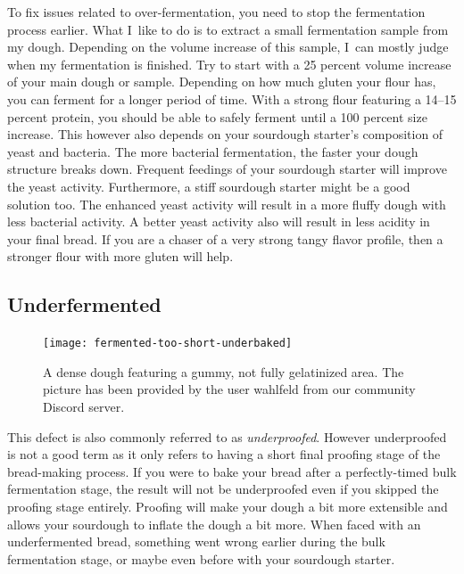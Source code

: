 To fix issues related to over-fermentation, you need to stop the fermentation process
earlier. What I~like to do is to extract a small fermentation sample from my dough.
Depending on the volume increase of this sample, I~can mostly judge when my fermentation
is finished. Try to start with a 25 percent volume increase of your main dough or sample.
Depending on how much gluten your flour has, you can ferment for a longer period of time.
With a strong flour featuring a 14--15 percent protein, you should be able to safely
ferment until a 100 percent size increase. This however also depends on your
sourdough starter's composition of yeast and bacteria. The more bacterial fermentation,
the faster your dough structure breaks down. Frequent feedings of your sourdough
starter will improve the yeast activity. Furthermore, a stiff sourdough starter
might be a good solution too. The enhanced yeast activity will result in a more fluffy
dough with less bacterial activity. A better yeast activity also will result
in less acidity in your final bread. If you are a chaser of a very strong tangy
flavor profile, then a stronger flour with more gluten will help.


\subsection{Underfermented}

\begin{figure}
  \texttt{[image: fermented-too-short-underbaked]}
  \caption{A dense dough featuring a gummy, not fully gelatinized area.
  The picture has been provided by the user wahlfeld from our community
Discord server.}%
  \label{fig:fermented-too-short-underbaked}
\end{figure}

This defect is also commonly referred to as \emph{underproofed}. However underproofed
is not a good term as it only refers to having a short final
proofing stage of the bread-making process.
If you were to bake your bread after a perfectly-timed bulk fermentation stage,
the result will not be underproofed even if you skipped the proofing stage entirely.
Proofing will make your dough a bit more extensible and allows your sourdough
to inflate the dough a bit more. When faced with an underfermented bread, something
went wrong earlier during the bulk fermentation stage, or maybe even
before with your sourdough starter.

